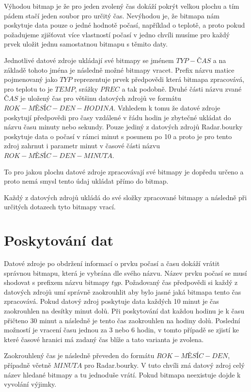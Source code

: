 \documentclass[czech,bachelor,dept460,male,csharp,cpdeclaration]{diploma}
\begin{document}
	Výhodou bitmap je že pro jeden zvolený čas dokáží pokrýt velkou plochu a tím pádem stačí jeden soubor pro určitý čas. Nevýhodou je, že bitmapa nám poskytuje data pouze o jedné hodnotě počasí, například o teplotě, a proto pokud požadujeme zjišťovat více vlastností počasí v jedno chvíli musíme pro každý prvek uložit jednu samostatnou bitmapu s těmito daty.
	
	Jednotlivé datové zdroje ukládají své bitmapy se jménem $TYP-ČAS$ a na základě tohoto jména je následně možné bitmapy vracet. Prefix názvu matice pojmenovaný jako $TYP$ reprezentuje prvek předpovědi která bitmapa zpracovává, pro teplotu to je $TEMP$, srážky $PREC$ a tak podobně. Druhé části názvu zvané $ČAS$ je uložený čas pro většinu datových zdrojů ve formátu $ROK-MĚSÍC-DEN-HODINA$. Vzhledem k tomu že datové zdroje poskytují předpovědi pro časy vzdálené v řádu hodin je zbytečné ukládat do názvu času minuty nebo sekundy. Pouze jediný z datových zdrojů Radar.bourky poskytuje data o počasí v rámci minut s posunem po 10 a proto je pro tento zdroj zahrnut i parametr minut v časové části názvu $ROK-MĚSÍC-DEN-MINUTA$.
	
	To pro jakou plochu datové zdroje zpracovávají své bitmapy je dopředu určeno a proto nemá smysl tento údaj ukládat přímo do bitmap.
	
	Každý z datových zdrojů ukládá do své složky zpracované bitmapy a následně při určitých dotazech tyto bitmapy vrací. 
	
	\section{Poskytování dat}
	
	Datové zdroje po obdržení informací o prvku počasí a času dokáží vrátit správnou bitmapu, která je vybrána dle svého názvu. Název prvku počasí se musí shodovat s prefixem názvu bitmapy $typ$. Požadovaný čas předpovědi si každý z datových zdrojů umí správně zaokrouhlit aby bylo jasné jaká bitmapa tento čas zpracovává. Pokud datový zdroj poskytuje data každých 10 minut je čas zaokrouhlen na desítky minut dolů. Při poskytování dat každou hodinu je k času přičteno 30 minut a následně je tento čas zaokrouhlen na hodiny dolů. Poslední možností je vracení času jednou za 3 nebo 6 hodin, v tomto případě se zjistí ke které časové hranici má zadaný čas blíže a tato varianta je zvolena.
	
	Zaokrouhlený čas je následně převeden do formátu $ROK-MĚSÍC-DEN$, případně včetně $MINUTA$ pro Radar.bourky. V tuto chvíli zná datový zdroj celý název hledané bitmapy a tu jednoduše vrátí. Pokud bitmapa neexistuje dojde k vyvolání výjimky.
	
\end{document}
